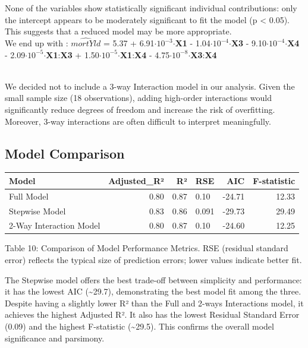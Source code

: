 \documentclass[
  12pt,
]{article}
\begin{document}
None of the variables show statistically significant individual
contributions: only the intercept appears to be moderately significant
to fit the model (p \textless{} 0.05). This suggests that a reduced
model may be more appropriate.\\
We end up with : \(\hat{mortYld}\) = 5.37 +
6.91\(\cdot\)\(10^{-3}\)\(\cdot\)\textbf{X1} -
1.04\(\cdot\)\(10^{-4}\)\(\cdot\)\textbf{X3} -
9.10\(\cdot\)\(10^{-4}\)\(\cdot\)\textbf{X4} -
2.09\(\cdot\)\(10^{-5}\)\(\cdot\)\textbf{X1}:\textbf{X3} +
1.50\(\cdot\)\(10^{-5}\)\(\cdot\)\textbf{X1}:\textbf{X4} -
4.75\(\cdot\)\(10^{-8}\)\(\cdot\)\textbf{X3}:\textbf{X4}\\
\strut \\
We decided not to include a 3-way Interaction model in our analysis.
Given the small sample size (18 observations), adding high-order
interactions would significantly reduce degrees of freedom and increase
the risk of overfitting. Moreover, 3-way interactions are often
difficult to interpret meaningfully.

\subsection{Model Comparison}\label{model-comparison}

\begingroup\fontsize{8}{10}\selectfont

\begin{longtable}[t]{lrrlrr}
\toprule
Model & Adjusted\_R² & R² & RSE & AIC & F-statistic\\
\midrule
Full Model & 0.80 & 0.87 & 0.10 & -24.71 & 12.33\\
Stepwise Model & 0.83 & 0.86 & 0.091 & -29.73 & 29.49\\
2-Way Interaction Model & 0.80 & 0.87 & 0.10 & -24.60 & 12.25\\
\bottomrule
\end{longtable}
\endgroup{}
\begin{center}
\vspace{-0.5em}
{\fontsize{12}{14}\selectfont Table 10: Comparison of Model Performance Metrics. RSE (residual standard error) reflects the typical size of prediction errors; lower values indicate better fit.\par}
\end{center}

The Stepwise model offers the best trade-off between simplicity and
performance: it has the lowest AIC (\textasciitilde29.7), demonstrating
the best model fit among the three. Despite having a slightly lower R²
than the Full and 2-ways Interactions model, it achieves the highest
Adjusted R². It also has the lowest Residual Standard Error (0.09) and
the highest F-statistic (\textasciitilde29.5). This confirms the overall
model significance and parsimony.
\end{document}
